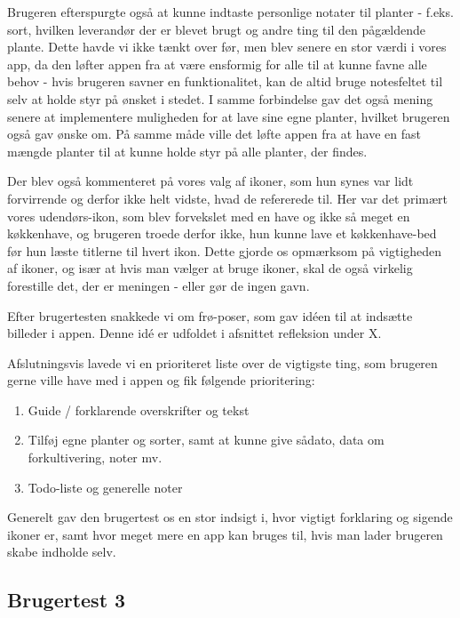 Brugeren efterspurgte også at kunne indtaste personlige notater til planter - f.eks. sort, hvilken leverandør der er blevet brugt og andre ting til den pågældende plante. Dette havde vi ikke tænkt over før, men blev senere en stor værdi i vores app, da den løfter appen fra at være ensformig for alle til at kunne favne alle behov - hvis brugeren savner en funktionalitet, kan de altid bruge notesfeltet til selv at holde styr på ønsket i stedet. I samme forbindelse gav det også mening senere at implementere muligheden for at lave sine egne planter, hvilket brugeren også gav ønske om. På samme måde ville det løfte appen fra at have en fast mængde planter til at kunne holde styr på alle planter, der findes.

Der blev også kommenteret på vores valg af ikoner, som hun synes var lidt forvirrende og derfor ikke helt vidste, hvad de refererede til. Her var det primært vores udendørs-ikon, som blev forvekslet med en have og ikke så meget en køkkenhave, og brugeren troede derfor ikke, hun kunne lave et køkkenhave-bed før hun læste titlerne til hvert ikon. Dette gjorde os opmærksom på vigtigheden af ikoner, og især at hvis man vælger at bruge ikoner, skal de også virkelig forestille det, der er meningen - eller gør de ingen gavn.

Efter brugertesten snakkede vi om frø-poser, som gav idéen til at indsætte billeder i appen. Denne idé er udfoldet i afsnittet refleksion under X.

Afslutningsvis lavede vi en prioriteret liste over de vigtigste ting, som brugeren gerne ville have med i appen og fik følgende prioritering:

\begin{enumerate}
    \item Guide / forklarende overskrifter og tekst
    \item Tilføj egne planter og sorter, samt at kunne give sådato, data om forkultivering, noter mv.
    \item Todo-liste og generelle noter
\end{enumerate}

Generelt gav den brugertest os en stor indsigt i, hvor vigtigt forklaring og sigende ikoner er, samt hvor meget mere en app kan bruges til, hvis man lader brugeren skabe indholde selv.

\subsection{Brugertest 3}

